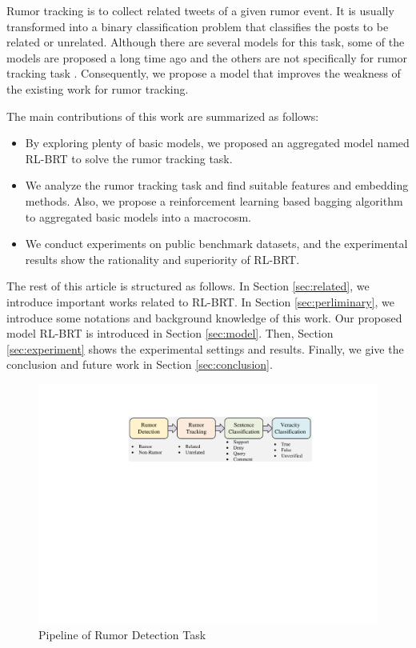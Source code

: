 Rumor tracking is to collect related tweets of a given rumor event. It is usually transformed into a binary classification problem that classifies the posts to be related or unrelated. Although there are several models for this task, some of the models are proposed a long time ago \cite{DBLP:conf/emnlp/QazvinianRRM11} and the others are not specifically for rumor tracking task \cite{DBLP:conf/www/ChengNB20}.
Consequently, we propose a model that improves the weakness of the existing work for rumor tracking.

The main contributions of this work are summarized as follows:
\begin{itemize}
	\item By exploring plenty of basic models, we proposed an aggregated model named RL-BRT to solve the rumor tracking task. 
	\item We analyze the rumor tracking task and find suitable features and embedding methods. Also, we propose a reinforcement learning based bagging algorithm to aggregated basic models into a macrocosm.
	\item We conduct experiments on public benchmark datasets, and the experimental results show the rationality and superiority of RL-BRT.
\end{itemize}

The rest of this article is structured as follows. In Section \ref{sec:related}, we introduce important works related to RL-BRT. In Section \ref{sec:perliminary}, we introduce some notations and background knowledge of this work. Our proposed model RL-BRT is introduced in Section \ref{sec:model}. Then, Section \ref{sec:experiment} shows the experimental settings and results. Finally, we give the conclusion and future work in Section \ref{sec:conclusion}.

\begin{figure}[tbp]
	\hspace{0ex}
	\vspace{0ex}
	\centering
	\includegraphics[width = \textwidth]{fig/pipeline}
	\caption{Pipeline of Rumor Detection Task}
	\label{fig:pipeline}
\end{figure}